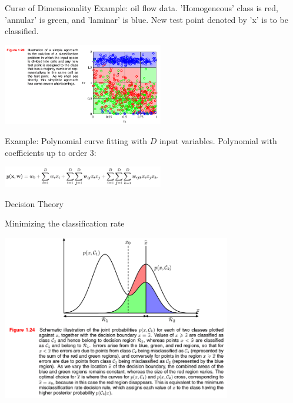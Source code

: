 \documentclass[9pt]{beamer}
\begin{document}
\begin{frame}{Curse of Dimensionality}
    Example: oil flow data. 'Homogeneous' class is red, 'annular' is green, and 'laminar' is blue.
    New test point denoted by 'x' is to be classified.
    \begin{center}
        \setlength{\fboxsep}{0.5pt} %
        \setlength{\fboxrule}{0.5pt}
        \includegraphics[width=7cm,fbox]{../images/Bishop_MachineLearning_Figure1-20.png} %
    \end{center}
    Example: Polynomial curve fitting with $D$ input variables. Polynomial with coefficients up to order 3:
    \begin{center}
        \setlength{\fboxsep}{0.5pt} %
        \setlength{\fboxrule}{0.5pt}
        \includegraphics[width=7cm,fbox]{../images/Bishop_MachineLearning_Eq1-74.png} %
    \end{center}
\end{frame}

\begin{frame}{Decision Theory}
    \begin{alertblock}{Minimizing the classification rate}
        \begin{center}
            \setlength{\fboxsep}{0.5pt} %
            \setlength{\fboxrule}{0.5pt}
            \includegraphics[width=10cm,fbox]{../images/Bishop_MachineLearning_Figure1-24.png} %
        \end{center}
    \end{alertblock}
\end{frame}

\end{document}
